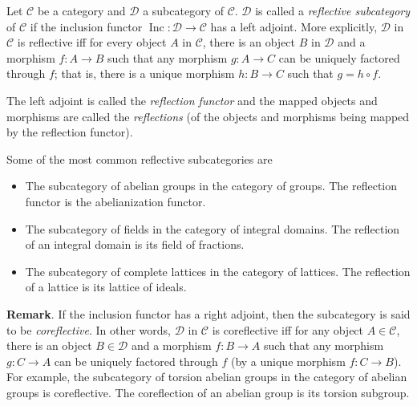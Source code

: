 \documentclass[12pt]{article}
\begin{document}
Let $\mathcal{C}$ be a category and $\mathcal{D}$ a subcategory of $\mathcal{C}$.  $\mathcal{D}$ is called a \emph{reflective subcategory} of $\mathcal{C}$ if the inclusion functor $\operatorname{Inc}:\mathcal{D}\to \mathcal{C}$ has a left adjoint.  More explicitly, $\mathcal{D}$ in $\mathcal{C}$ is reflective iff for every object $A$ in $\mathcal{C}$, there is an object $B$ in $\mathcal{D}$ and a morphism $f:A\to B$ such that any morphism $g:A\to C$ can be uniquely factored through $f$; that is, there is a unique morphism $h:B\to C$ such that $g=h\circ f$.

The left adjoint is called the \emph{reflection functor} and the mapped objects and morphisms are called the \emph{reflections} (of the objects and morphisms being mapped by the reflection functor).

Some of the most common reflective subcategories are
\begin{itemize}
\item The subcategory of abelian groups in the category of groups.  The reflection functor is the abelianization functor.
\item The subcategory of fields in the category of integral domains.  The reflection of an integral domain is its field of fractions.
\item The subcategory of complete lattices in the category of lattices.  The reflection of a lattice is its lattice of ideals.
\end{itemize}

\textbf{Remark}.  If the inclusion functor has a right adjoint, then the subcategory is said to be \emph{coreflective}.  In other words, $\mathcal{D}$ in $\mathcal{C}$ is coreflective iff for any object $A\in \mathcal{C}$, there is an object $B\in \mathcal{D}$ and a morphism $f:B\to A$ such that any morphism $g:C\to A$ can be uniquely factored through $f$ (by a unique morphism $f:C\to B$).  For example, the subcategory of torsion abelian groups in the category of abelian groups is coreflective.  The coreflection of an abelian group is its torsion subgroup.
\end{document}
